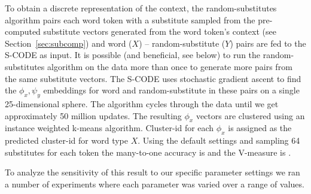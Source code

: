 To obtain a discrete representation of the context, the
random-substitutes algorithm pairs each word token with a substitute
sampled from the pre-computed substitute vectors generated from the
word token's context (see Section~\ref{sec:subcomp}) and word ($X$) --
random-substitute ($Y$) pairs are fed to the S-CODE as input.  It is
possible (and beneficial, see below) to run the random-substitutes
algorithm on the data more than once to generate more pairs from the
same substitute vectors.  The S-CODE uses stochastic gradient ascent
to find the $\phi_x, \psi_y$ embeddings for word and random-substitute
in these pairs on a single 25-dimensional sphere.  The algorithm
cycles through the data until we get approximately 50 million updates.
The resulting $\phi_x$ vectors are clustered using an instance
weighted k-means algorithm.  Cluster-id for each $\phi_x$ is assigned
as the predicted cluster-id for word type $X$.  Using the default
settings and sampling 64 substitutes for each token the many-to-one
accuracy is \wsmto and the V-measure is \wsvm.


To analyze the sensitivity of this result to our specific parameter
settings we ran a number of experiments where each parameter was
varied over a range of values.


